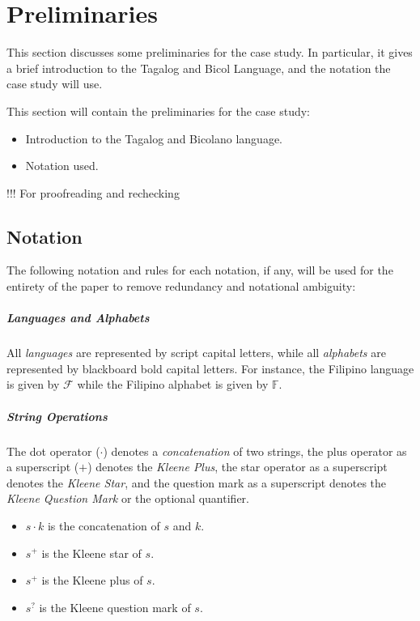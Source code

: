 \chapter{Preliminaries}
This section discusses some preliminaries for the case study. In particular, it gives a brief introduction to the Tagalog and Bicol Language, and the notation the case study will use.

    {\color{blue}
        This section will contain the preliminaries for the case study:

        \begin{itemize}
            \item Introduction to the Tagalog and Bicolano language.
            \item Notation used.
        \end{itemize}

        !!! For proofreading and rechecking
    }

\section{Notation}
The following notation and rules for each notation, if any, will be used for the entirety of the paper to remove redundancy and notational ambiguity:

\paragraph{Languages and Alphabets}
All \emph{languages} are represented by script capital letters, while all \emph{alphabets} are represented by blackboard bold capital letters. For instance, the Filipino language is given by \(\mathcal{F}\) while the Filipino alphabet is given by \(\mathbb{F}\).

\paragraph{String Operations}
The dot operator (\(\cdot\)) denotes a \emph{concatenation} of two strings, the plus operator as a superscript (\(+\)) denotes the \emph{Kleene Plus}, the star operator as a superscript denotes the \emph{Kleene Star}, and the question mark as a superscript denotes the \emph{Kleene Question Mark} or the optional quantifier.

\begin{itemize}
    \item $s\cdot k$ is the concatenation of $s$ and $k$.
    \item $s^+$ is the Kleene star of $s$.
    \item $s^+$ is the Kleene plus of $s$.
    \item $s^?$ is the Kleene question mark of $s$.
\end{itemize}

